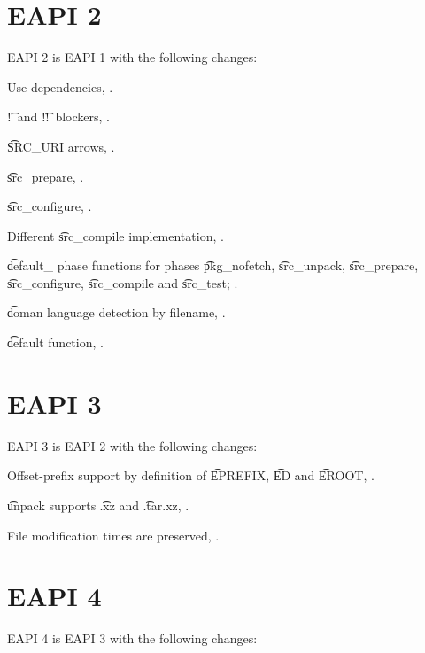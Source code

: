 \section{EAPI 2}

EAPI 2 is EAPI 1 with the following changes:

\begin{compactitem}
\item Use dependencies, .
\item \t{!}\ and \t{!!}\ blockers, .
\item \t{SRC_URI} arrows, .
\item \t{src_prepare}, .
\item \t{src_configure}, .
\item Different \t{src_compile} implementation, .
\item \t{default_} phase functions for phases \t{pkg_nofetch}, \t{src_unpack}, \t{src_prepare},
    \t{src_configure}, \t{src_compile} and \t{src_test}; .
\item \t{doman} language detection by filename, .
\item \t{default} function, .
\end{compactitem}

\section{EAPI 3}

EAPI 3 is EAPI 2 with the following changes:
\begin{compactitem}
\item Offset-prefix support by definition of \t{EPREFIX}, \t{ED} and \t{EROOT},
    .
\item \t{unpack} supports \t{.xz} and \t{.tar.xz}, .
\item File modification times are preserved, .
\end{compactitem}

\section{EAPI 4}

EAPI 4 is EAPI 3 with the following changes:

